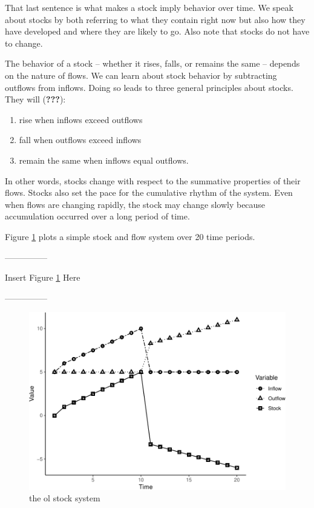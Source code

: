 \documentclass[english,,man]{apa6}
\providecommand{\tightlist}{%
  \setlength{\itemsep}{0pt}\setlength{\parskip}{0pt}}
\theoremstyle{definition}
\theoremstyle{definition}
\theoremstyle{definition}
\theoremstyle{remark}
\begin{document}
\noindent That last sentence is what makes a stock imply behavior over
time. We speak about stocks by both referring to what they contain right
now but also how they have developed and where they are likely to go.
Also note that stocks do not have to change.

The behavior of a stock -- whether it rises, falls, or remains the same
-- depends on the nature of flows. We can learn about stock behavior by
subtracting outflows from inflows. Doing so leads to three general
principles about stocks. They will ({\textbf{???}}):

\begin{enumerate}
\def\labelenumi{\arabic{enumi}.}
\tightlist
\item
  rise when inflows exceed outflows
\item
  fall when outflows exceed inflows
\item
  remain the same when inflows equal outflows.
\end{enumerate}

\noindent In other words, stocks change with respect to the summative
properties of their flows. Stocks also set the pace for the cumulative
rhythm of the system. Even when flows are changing rapidly, the stock
may change slowly because accumulation occurred over a long period of
time.

Figure \ref{stocks} plots a simple stock and flow system over 20 time
periods.

\begin{center}

---------------

Insert Figure \ref{stocks} Here

---------------

\end{center}

\begin{figure}
\centering
\includegraphics{figs/unnamed-chunk-5-1.pdf}
\caption{\label{fig:unnamed-chunk-5}the ol stock system\label{stocks}}
\end{figure}
\end{document}
